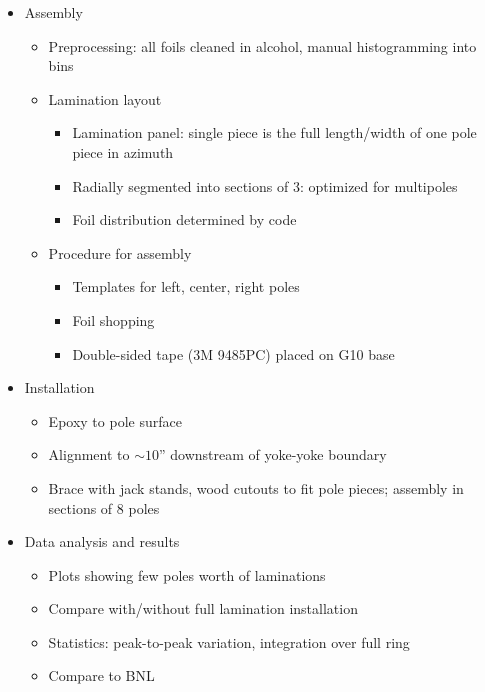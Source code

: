 \begin{itemize}
\begin{itemize}
         \end{itemize}  
   \item Assembly
         \begin{itemize}
            \item Preprocessing: all foils cleaned in alcohol, manual histogramming into bins
            \item Lamination layout
                  \begin{itemize}
                     \item Lamination panel: single piece is the full length/width of one pole piece in azimuth 
                     \item Radially segmented into sections of 3: optimized for multipoles 
                     \item Foil distribution determined by code 
                  \end{itemize}   
            \item Procedure for assembly
                  \begin{itemize}
                     \item Templates for left, center, right poles 
		     \item Foil shopping
                     \item Double-sided tape (3M 9485PC) placed on G10 base
                  \end{itemize}
         \end{itemize} 
   \item Installation 
         \begin{itemize}
            \item Epoxy to pole surface 
            \item Alignment to $\sim 10$'' downstream of yoke-yoke boundary  
            \item Brace with jack stands, wood cutouts to fit pole pieces; assembly in sections of 8 poles   
         \end{itemize} 
   \item Data analysis and results   
         \begin{itemize}  
            \item Plots showing few poles worth of laminations 
            \item Compare with/without full lamination installation
            \item Statistics: peak-to-peak variation, integration over full ring 
            \item Compare to BNL   
         \end{itemize} 
\end{itemize} 

